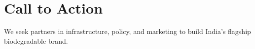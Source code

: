 \section{Call to Action}
We seek partners in infrastructure, policy, and marketing to build India's flagship biodegradable brand.
